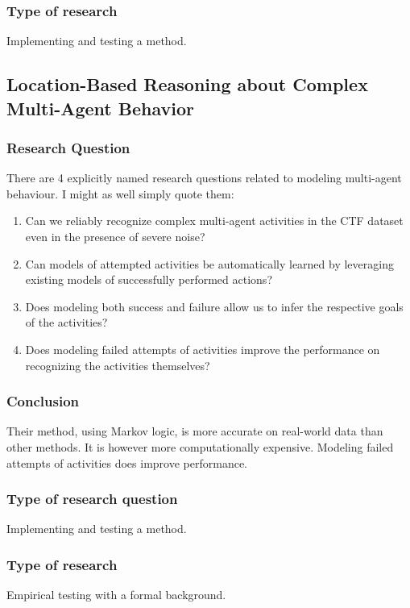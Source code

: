 \documentclass[a4paper, 10pt]{article}
\begin{document}
\subsubsection*{Type of research}
Implementing and testing a method.

\subsection{Location-Based Reasoning about Complex Multi-Agent Behavior}
\subsubsection*{Research Question}
There are 4 explicitly named research questions related to modeling multi-agent behaviour.
I might as well simply quote them:

\begin{enumerate}
\item Can we reliably recognize complex multi-agent activities in the CTF
  dataset even in the presence of severe noise?
\item Can models of attempted activities be automatically learned by leveraging
  existing models of successfully performed actions?
\item Does modeling both success and failure allow us to infer the respective
  goals of the activities?
\item Does modeling failed attempts of activities improve the performance on
  recognizing the activities themselves?
\end{enumerate}

\subsubsection*{Conclusion}
Their method, using Markov logic, is more accurate on real-world data than other
methods. It is however more computationally expensive. Modeling failed attempts
of activities does improve performance.

\subsubsection*{Type of research question}
Implementing and testing a method.
\subsubsection*{Type of research}
Empirical testing with a formal background.
\end{document}
